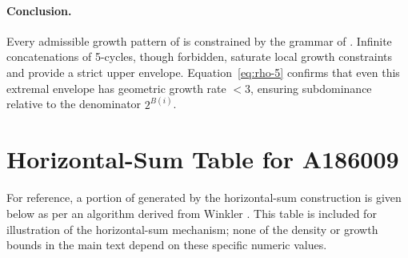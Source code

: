 \documentclass[12pt, oneside]{article}   	%
\numberwithin{equation}{section}          %
\theoremstyle{definition}
\begin{document}
\paragraph{Conclusion.}
Every admissible growth pattern of  is constrained by the grammar
of . Infinite concatenations of 5-cycles, though forbidden, saturate
local growth constraints and provide a strict upper envelope. Equation~\eqref{eq:rho-5}
confirms that even this extremal envelope has geometric growth rate $< 3$, ensuring
subdominance relative to the denominator $2^{B(i)}$.


\newpage
\section{Horizontal-Sum Table for A186009}
\label{app:horizontal-sum-table}

For reference, a portion of  generated by the horizontal-sum construction is
given below as per an algorithm derived from Winkler \cite{Winkler2017}. This table is included
for illustration of the horizontal-sum mechanism; none of the density or growth bounds in the
main text depend on these specific numeric values.
\end{document}
